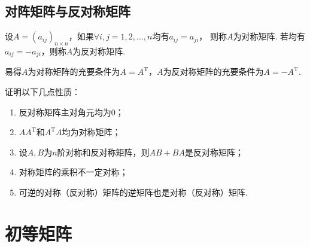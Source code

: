 \subsection{对阵矩阵与反对称矩阵}
\begin{definition}
    设$A=(a_{ij})_{n \times n}$，如果$\forall i,j=1,2,\ldots,n$均有$a_{ij}=a_{ji}$，
    则称$A$为对称矩阵. 若均有$a_{ij}=-a_{ji}$，则称$A$为反对称矩阵.
\end{definition}
易得$A$为对称矩阵的充要条件为$A=A^\mathrm{T}$，$A$为反对称矩阵的充要条件为$A=-A^\mathrm{T}$.
\begin{example}
    证明以下几点性质：
    \begin{enumerate}
        \item 反对称矩阵主对角元均为0；

        \item $AA^\mathrm{T}$和$A^\mathrm{T}A$均为对称矩阵；

        \item 设$A,B$为$n$阶对称和反对称矩阵，则$AB+BA$是反对称矩阵；

        \item 对称矩阵的乘积不一定对称；

        \item 可逆的对称（反对称）矩阵的逆矩阵也是对称（反对称）矩阵.
    \end{enumerate}
\end{example}

\section{初等矩阵}
